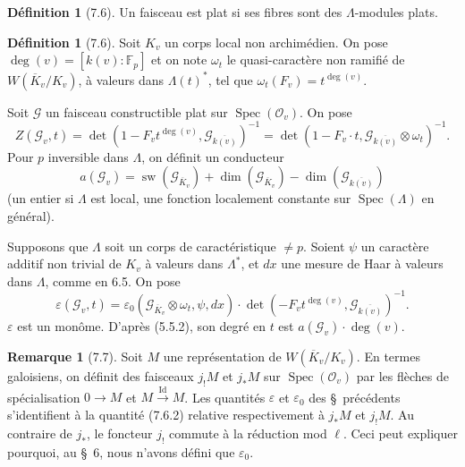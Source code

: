 \documentclass[11pt]{amsart}
\theoremstyle{plain}
\theoremstyle{definition}
\newtheorem{definition}[theorem]{D\'efinition}
\newtheorem{remark}[theorem]{Remarque}
\DeclareMathOperator{\Spec}{Spec}
\DeclareMathOperator{\Id}{Id}
\DeclareMathOperator{\sw}{sw}
\begin{document}
\begin{definition}[7.6]
Un faisceau est plat si ses fibres sont des $\Lambda$-modules plats.
\end{definition}

\begin{definition}[7.6]
Soit $K_v$ un corps local non archim\'edien. On pose $\deg(v) = [k(v):\mathbb{F}_p]$ et on note $\omega_t$ le quasi-caract\`ere non ramifi\'e de $W(\overline{K}_v/K_v)$, \`a valeurs dans $\Lambda(t)^*$, tel que $\omega_t(F_v) = t^{\deg(v)}$.

Soit $\mathcal{G}$ un faisceau constructible plat sur $\Spec(\mathcal{O}_v)$. On pose
\begin{equation}
Z(\mathcal{G}_v,t) = \det(1 - F_v t^{\deg(v)}, \mathcal{G}_{\overline{k(v)}})^{-1} = \det(1 - F_v \cdot t, \mathcal{G}_{\overline{k(v)}} \otimes \omega_t)^{-1}.
\tag{7.6.0}
\end{equation}
Pour $p$ inversible dans $\Lambda$, on d\'efinit un conducteur
\begin{equation}
a(\mathcal{G}_v) = \sw(\mathcal{G}_{\overline{K}_v}) + \dim(\mathcal{G}_{\overline{K}_v}) - \dim(\mathcal{G}_{\overline{k(v)}})
\tag{7.6.1}
\end{equation}
(un entier si $\Lambda$ est local, une fonction localement constante sur $\Spec(\Lambda)$ en g\'en\'eral).

Supposons que $\Lambda$ soit un corps de caract\'eristique $\not= p$. Soient $\psi$ un caract\`ere additif non trivial de $K_v$ \`a valeurs dans $\Lambda^*$, et $dx$ une mesure de Haar \`a valeurs dans $\Lambda$, comme en 6.5. On pose
\begin{equation}
\varepsilon(\mathcal{G}_v,t) = \varepsilon_0(\mathcal{G}_{\overline{K}_v} \otimes \omega_t, \psi, dx) \cdot \det(-F_v t^{\deg(v)}, \mathcal{G}_{\overline{k(v)}})^{-1}.
\tag{7.6.2}
\end{equation}
$\varepsilon$ est un mon\^ome. D'apr\`es (5.5.2), son degr\'e en $t$ est $a(\mathcal{G}_v) \cdot \deg(v)$.
\end{definition}

\begin{remark}[7.7]
Soit $M$ une repr\'esentation de $W(\overline{K}_v/K_v)$. En termes galoisiens, on d\'efinit des faisceaux $j_!M$ et $j_*M$ sur $\Spec(\mathcal{O}_v)$ par les fl\`eches de sp\'ecialisation $0 \to M$ et $M \xrightarrow{\Id} M$. Les quantit\'es $\varepsilon$ et $\varepsilon_0$ des \S\ pr\'ec\'edents s'identifient \`a la quantit\'e (7.6.2) relative respectivement \`a $j_*M$ et $j_!M$. Au contraire de $j_*$, le foncteur $j_!$ commute \`a la r\'eduction mod $\ell$. Ceci peut expliquer pourquoi, au \S\ 6, nous n'avons d\'efini que $\varepsilon_0$.
\end{remark}
\end{document}
